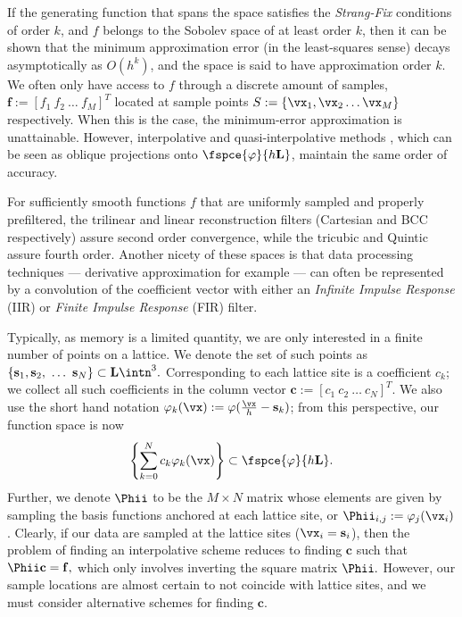 If the generating function that spans the space satisfies the \emph{Strang-Fix} conditions of order $k$, and $f$ belongs to the Sobolev space of at least order $k$, then it can be shown that the minimum approximation error (in the least-squares sense) decays asymptotically as $O(h^k)$, and the space is said to have approximation order $k$. We often only have access to $f$ through a discrete amount of samples, $\mathbf{f} := \left[ f_1 \ f_2 \ \hdots \ f_M \right]^T$ located at sample points $S := \{\vx_1, \vx_2 \hdots \vx_M \}$ respectively. When this is the case, the minimum-error approximation is unattainable. However, interpolative and quasi-interpolative methods \cite{quasibcc,interprev}, which can be seen as oblique projections onto $\fspce{\varphi}{h\mathbf{L}}$, maintain the same order of accuracy.

For sufficiently smooth functions $f$ that are uniformly sampled and properly prefiltered, the trilinear and linear reconstruction filters (Cartesian and BCC respectively) assure second order convergence, while the tricubic and Quintic assure fourth order. Another nicety of these spaces is that data processing techniques --- derivative approximation for example --- can often be represented by a convolution of the coefficient vector with either an \emph{Infinite Impulse Response} (IIR) or \emph{Finite Impulse Response} (FIR) filter. 

Typically, as memory is a limited quantity, we are only interested in a finite number of points on a lattice. We denote the set of such points as $\{\mathbf{s}_1,\mathbf{s}_2,\ \hdots  \ \mathbf{s}_N\} \subset \mathbf{L}\intn^3.$ Corresponding to each lattice site is a coefficient $c_k$; we collect all such coefficients in the column vector $\mathbf{c}:=\left[c_1 \ c_2 \ \hdots \ c_N \right]^T.$ We also use the short hand notation $\varphi_k(\vx) := \varphi(\frac{\vx}{h}-\mathbf{s}_k)$; from this perspective, our function space is now {\small 
\begin{equation}
	\left\{ \displaystyle\sum_{k=0}^N c_k \varphi_k(\vx) \right\} \subset \fspce{\varphi}{h\mathbf{L}}.
\end{equation}}
Further, we denote $\mathbf{\Phii}$ to be the $M \times N$ matrix whose elements are given by sampling the basis functions anchored at each lattice site, or $\Phii_{i,j} := \varphi_j(\vx_i)$. Clearly, if our data are sampled at the lattice sites ($\vx_i = \mathbf{s}_i$), then the problem of finding an interpolative scheme reduces to finding $\mathbf{c}$ such that $\mathbf{\Phii c=f},$ which only involves inverting the square matrix $\mathbf{\Phii}.$ However, our sample locations are almost certain to not coincide with lattice sites, and we must consider alternative schemes for finding $\mathbf{c}.$


